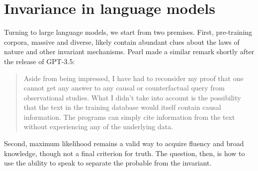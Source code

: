 \section{Invariance in language models}\label{sec:prompt}

Turning to large language models, we start from two premises. First, pre-training corpora, massive and diverse, likely contain abundant clues about the laws of nature and other invariant mechanisms. Pearl made a similar remark shortly after the release of GPT-3.5:
\begin{quote}
Aside from being impressed, I have had to reconsider my proof that one cannot get any answer to any causal or counterfactual query from observational studies. What I didn't take into account is the possibility that the text in the training database would itself contain causal information. The programs can simply cite information from the text without experiencing any of the underlying data. \citep{pearl_gpt}
\end{quote}
Second, maximum likelihood remains a valid way to acquire fluency and broad knowledge, though not a final criterion for truth. The question, then, is how to use the ability to speak to separate the probable from the invariant.

